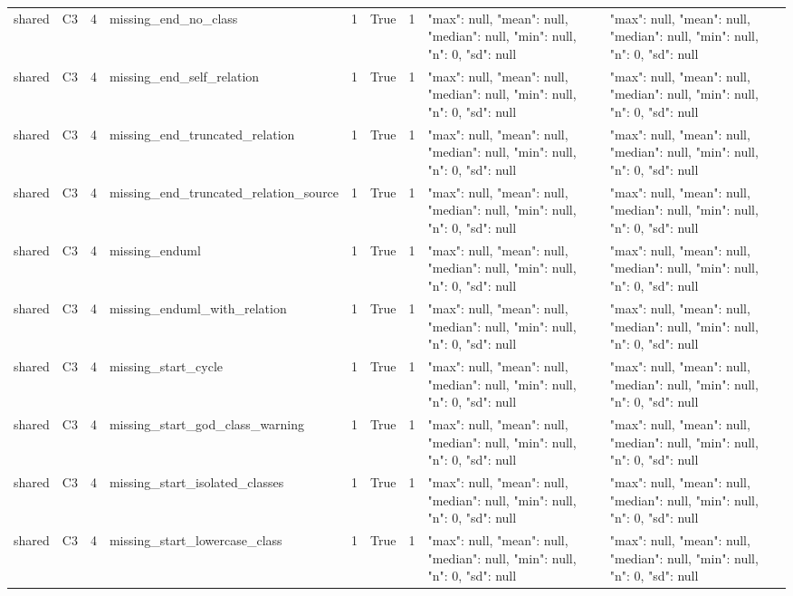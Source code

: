 \begin{tabular}{lllllllll}
shared & C3 & 4 & missing\_end\_no\_class & 1 & True & 1 & {"max": null, "mean": null, "median": null, "min": null, "n": 0, "sd": null} & {"max": null, "mean": null, "median": null, "min": null, "n": 0, "sd": null} \\
shared & C3 & 4 & missing\_end\_self\_relation & 1 & True & 1 & {"max": null, "mean": null, "median": null, "min": null, "n": 0, "sd": null} & {"max": null, "mean": null, "median": null, "min": null, "n": 0, "sd": null} \\
shared & C3 & 4 & missing\_end\_truncated\_relation & 1 & True & 1 & {"max": null, "mean": null, "median": null, "min": null, "n": 0, "sd": null} & {"max": null, "mean": null, "median": null, "min": null, "n": 0, "sd": null} \\
shared & C3 & 4 & missing\_end\_truncated\_relation\_source & 1 & True & 1 & {"max": null, "mean": null, "median": null, "min": null, "n": 0, "sd": null} & {"max": null, "mean": null, "median": null, "min": null, "n": 0, "sd": null} \\
shared & C3 & 4 & missing\_enduml & 1 & True & 1 & {"max": null, "mean": null, "median": null, "min": null, "n": 0, "sd": null} & {"max": null, "mean": null, "median": null, "min": null, "n": 0, "sd": null} \\
shared & C3 & 4 & missing\_enduml\_with\_relation & 1 & True & 1 & {"max": null, "mean": null, "median": null, "min": null, "n": 0, "sd": null} & {"max": null, "mean": null, "median": null, "min": null, "n": 0, "sd": null} \\
shared & C3 & 4 & missing\_start\_cycle & 1 & True & 1 & {"max": null, "mean": null, "median": null, "min": null, "n": 0, "sd": null} & {"max": null, "mean": null, "median": null, "min": null, "n": 0, "sd": null} \\
shared & C3 & 4 & missing\_start\_god\_class\_warning & 1 & True & 1 & {"max": null, "mean": null, "median": null, "min": null, "n": 0, "sd": null} & {"max": null, "mean": null, "median": null, "min": null, "n": 0, "sd": null} \\
shared & C3 & 4 & missing\_start\_isolated\_classes & 1 & True & 1 & {"max": null, "mean": null, "median": null, "min": null, "n": 0, "sd": null} & {"max": null, "mean": null, "median": null, "min": null, "n": 0, "sd": null} \\
shared & C3 & 4 & missing\_start\_lowercase\_class & 1 & True & 1 & {"max": null, "mean": null, "median": null, "min": null, "n": 0, "sd": null} & {"max": null, "mean": null, "median": null, "min": null, "n": 0, "sd": null} \\

\end{tabular}
